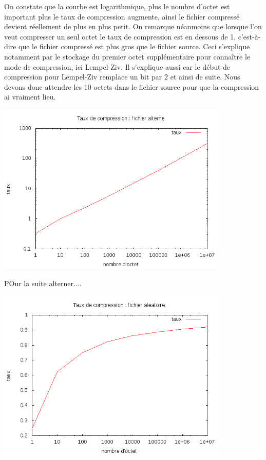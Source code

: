 \documentclass{report}
\begin{document}
On constate que la courbe est logarithmique, plus le nombre d'octet est important plus le taux de compression augmente, ainsi le fichier compressé devient réellement de plus en plus petit. 
On remarque néanmoins que lorsque l'on veut compresser un seul octet le taux de compression est en dessous de 1, c'est-à-dire que le fichier compressé est plus gros que le fichier source. Ceci s'explique notamment par le stockage du premier  octet supplémentaire pour connaître le mode de compression, ici Lempel-Ziv. Il s'explique aussi car le début de compression pour Lempel-Ziv remplace un bit par 2 et ainsi de suite. Nous devons donc attendre les 10 octets dans le fichier source pour que la compression ai vraiment lieu. 

\begin{center}

\includegraphics[width=11cm]{LZAlterner.png}

\end{center}

POur la suite alterner....
\begin{center}

\includegraphics[width=11cm]{LZAleatoire.png}

\end{center}
\end{document}
